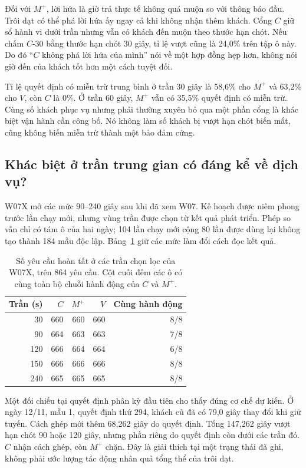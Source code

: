 Đối với $M^{+}$, lời hứa là giờ trả thực tế không quá muộn so với thông báo đầu.
Trôi dạt có thể phá lời hứa ấy ngay cả khi không nhận thêm khách. Cổng $C$
giữ sổ hành vi dưới trần nhưng vẫn có khách đến muộn theo thước hạn chót. Nếu
chấm $C$-30 bằng thước hạn chót 30 giây, tỉ lệ vượt cũng là 24,0\% trên tập ô
này. Do đó ``$C$ không phá lời hứa của mình'' nói về một hợp đồng hẹp hơn,
không nói giờ đến của khách tốt hơn một cách tuyệt đối.

Tỉ lệ quyết định có miễn trừ trung bình ở trần 30 giây là 58,6\% cho $M^{+}$
và 63,2\% cho $V$, còn $C$ là 0\%. Ở trần 60 giây, $M^{+}$ vẫn có 35,5\%
quyết định có miễn trừ. Cùng số khách phục vụ nhưng phải thường xuyên bỏ qua
một phần cổng là khác biệt vận hành cần công bố. Nó không làm số khách bị vượt
hạn chót biến mất, cũng không biến miễn trừ thành một bảo đảm cứng.

\subsection{Khác biệt ở trần trung gian có đáng kể về dịch vụ?}

W07X mở các mức 90--240 giây sau khi đã xem W07. Kế hoạch được niêm phong trước
lần chạy mới, nhưng vùng trần được chọn từ kết quả phát triển. Phép so vẫn chỉ
có tám ô của hai ngày; 104 lần chạy mới cộng 80 lần được dùng lại không tạo
thành 184 mẫu độc lập. Bảng~\ref{bang:w07x} giữ các mức làm đổi cách đọc kết quả.

\begin{table}[htbp]
\centering
\caption{Số yêu cầu hoàn tất ở các trần chọn lọc của W07X, trên 864 yêu cầu.
Cột cuối đếm các ô có cùng toàn bộ chuỗi hành động của $C$ và $M^{+}$.}
\label{bang:w07x}
\begin{tabular}{@{}rrrrr@{}}
\toprule
\textbf{Trần (s)} & \textbf{$C$} & \textbf{$M^{+}$} & \textbf{$V$} & \textbf{Cùng hành động}\\
\midrule
30 & 660 & 660 & 660 & 8/8\\
90 & 664 & 663 & 663 & 7/8\\
120 & 666 & 664 & 664 & 6/8\\
150 & 666 & 666 & 666 & 8/8\\
240 & 665 & 665 & 665 & 8/8\\
\bottomrule
\end{tabular}
\end{table}

Một đối chiếu tại quyết định phân kỳ đầu tiên cho thấy đúng cơ chế dự kiến.
Ở ngày 12/11, mẫu 1, quyết định thứ 294, khách cũ đã có 79,0 giây thay đổi khi
giữ tuyến. Cách ghép mới thêm 68,262 giây do quyết định. Tổng 147,262 giây vượt
hạn chót 90 hoặc 120 giây, nhưng phần riêng do quyết định còn dưới các trần đó.
$C$ nhận cách ghép, còn $M^{+}$ chặn. Đây là giải thích tại một trạng thái đã
ghi, không phải ước lượng tác động nhân quả tổng thể của trôi dạt.

